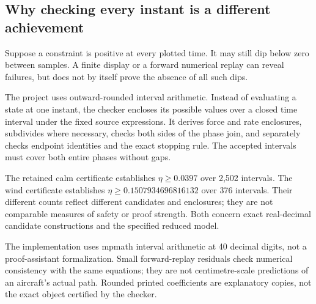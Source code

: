 \subsection*{Why checking every instant is a different achievement}
Suppose a constraint is positive at every plotted time. It may still dip below zero between samples. A finite display or a forward numerical replay can reveal failures, but does not by itself prove the absence of all such dips.


The project uses outward-rounded interval arithmetic. Instead of evaluating a state at one instant, the checker encloses its possible values over a closed time interval under the fixed source expressions. It derives force and rate enclosures, subdivides where necessary, checks both sides of the phase join, and separately checks endpoint identities and the exact stopping rule. The accepted intervals must cover both entire phases without gaps.

The retained calm certificate establishes $\eta\geq0.0397$ over 2,502 intervals. The wind certificate establishes $\eta\geq0.1507934696816132$ over 376 intervals. Their different counts reflect different candidates and enclosures; they are not comparable measures of safety or proof strength. Both concern exact real-decimal candidate constructions and the specified reduced model.


The implementation uses mpmath interval arithmetic at 40 decimal digits, not a proof-assistant formalization. Small forward-replay residuals check numerical consistency with the same equations; they are not centimetre-scale predictions of an aircraft's actual path. Rounded printed coefficients are explanatory copies, not the exact object certified by the checker.
\clearpage
